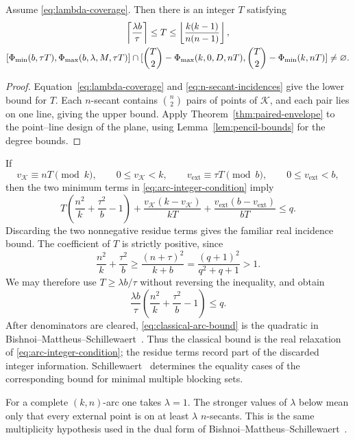 \begin{corollary}
\label{cor:n-secant-feasibility}
Assume \eqref{eq:lambda-coverage}.  Then there is an integer \(T\) satisfying
\begin{gather}
 \left\lceil\frac{\lambda b}{\tau}\right\rceil
 \le T\le
 \left\lfloor\frac{k(k-1)}{n(n-1)}\right\rfloor,
 \label{eq:T-range}\\
 [\Phimin(b,\tau T),\Phimax(b,\lambda,M,\tau T)]
 \cap
 [\binom T2-\Phimax(k,0,D,nT),
  \binom T2-\Phimin(k,nT)]\ne\varnothing.
 \label{eq:arc-integer-condition}
\end{gather}
\end{corollary}

\begin{proof}
Equation~\eqref{eq:lambda-coverage} and
\eqref{eq:n-secant-incidences} give the lower bound for \(T\).  Each
\(n\)-secant contains \(\binom n2\) pairs of points of \(\mathcal K\), and
each pair lies on one line, giving the upper bound.  Apply
Theorem~\ref{thm:paired-envelope} to the point--line design of the plane,
using Lemma~\ref{lem:pencil-bounds} for the degree bounds.
\end{proof}

If
\[
 v_{\mathcal K}\equiv nT\pmod k,\qquad 0\le v_{\mathcal K}<k,
 \qquad
 v_{\mathrm{ext}}\equiv\tau T\pmod b,\qquad 0\le v_{\mathrm{ext}}<b,
\]
then the two minimum terms in \eqref{eq:arc-integer-condition} imply
\begin{equation}\label{eq:integer-incidence-bound}
 T\left(\frac{n^2}{k}+\frac{\tau^2}{b}-1\right)
 +\frac{v_{\mathcal K}(k-v_{\mathcal K})}{kT}
 +\frac{v_{\mathrm{ext}}(b-v_{\mathrm{ext}})}{bT}
 \le q.
\end{equation}
Discarding the two nonnegative residue terms gives the familiar real
incidence bound.  The coefficient of \(T\) is strictly positive, since
\[
 \frac{n^2}{k}+\frac{\tau^2}{b}
 \ge \frac{(n+\tau)^2}{k+b}
 =\frac{(q+1)^2}{q^2+q+1}>1.
\]
We may therefore use \(T\ge\lambda b/\tau\) without reversing the
inequality, and obtain
\begin{equation}\label{eq:classical-arc-bound}
 \frac{\lambda b}{\tau}
 \left(\frac{n^2}{k}+\frac{\tau^2}{b}-1\right)\le q.
\end{equation}
After denominators are cleared, \eqref{eq:classical-arc-bound} is the
quadratic in Bishnoi--Mattheus--Schillewaert~\cite[Theorem~8.1]{BMS}.
Thus the classical bound is the real relaxation of
\eqref{eq:arc-integer-condition}; the residue terms record part of the
discarded integer information.  Schillewaert~\cite{Schillewaert} determines
the equality cases of the corresponding bound for minimal multiple blocking
sets.

\begin{remark}\label{rem:ordinary-completeness}
For a complete \((k,n)\)-arc one takes \(\lambda=1\).  The stronger values of
\(\lambda\) below mean only that every external point is on at least
\(\lambda\) \(n\)-secants.  This is the same multiplicity hypothesis used in
the dual form of Bishnoi--Mattheus--Schillewaert~\cite[Theorem~8.1]{BMS}.
\end{remark}
